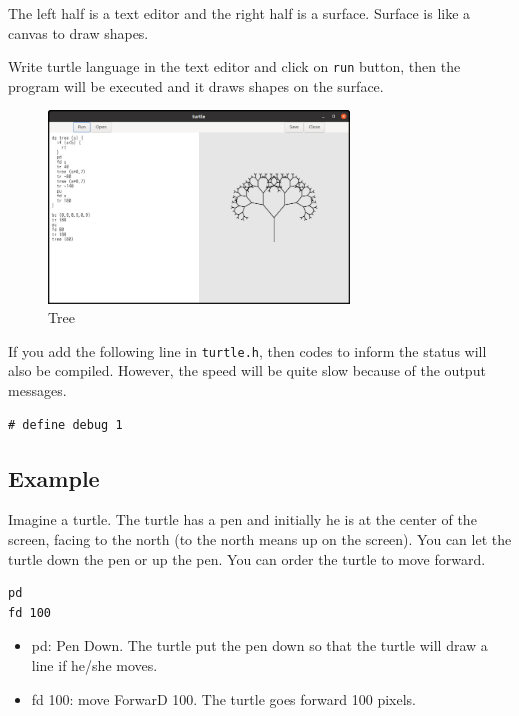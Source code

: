 The left half is a text editor and the right half is a surface. Surface
is like a canvas to draw shapes.

Write turtle language in the text editor and click on
\passthrough{\lstinline!run!} button, then the program will be executed
and it draws shapes on the surface.

\begin{figure}
\centering
\includegraphics[width=8cm,height=5.11cm]{../src/turtle/image/turtle_tree.png}
\caption{Tree}
\end{figure}

If you add the following line in \passthrough{\lstinline!turtle.h!},
then codes to inform the status will also be compiled. However, the
speed will be quite slow because of the output messages.

\begin{lstlisting}
# define debug 1
\end{lstlisting}

\hypertarget{example}{%
\subsection{Example}\label{example}}

Imagine a turtle. The turtle has a pen and initially he is at the center
of the screen, facing to the north (to the north means up on the
screen). You can let the turtle down the pen or up the pen. You can
order the turtle to move forward.

\begin{lstlisting}
pd
fd 100
\end{lstlisting}

\begin{itemize}
\tightlist
\item
  pd: Pen Down. The turtle put the pen down so that the turtle will draw
  a line if he/she moves.
\item
  fd 100: move ForwarD 100. The turtle goes forward 100 pixels.
\end{itemize}

